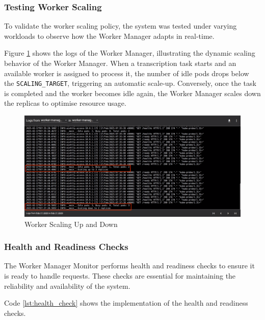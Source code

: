 \subsubsection{Testing Worker Scaling}
To validate the worker scaling policy, the system was tested under varying workloads to observe how the Worker Manager adapts in real-time.

Figure \ref{fig:worker_scaling_up_down} shows the logs of the Worker Manager, illustrating the dynamic scaling behavior of the Worker Manager. When a transcription task starts and an available worker is assigned to process it, the number of idle pods drops below the \texttt{SCALING\_TARGET}, triggering an automatic scale-up. Conversely, once the task is completed and the worker becomes idle again, the Worker Manager scales down the replicas to optimise resource usage.

\begin{figure}[H]
  \centering
  \includegraphics[width=\textwidth]{figures/worker_scaling_up_down.png}
  \caption{Worker Scaling Up and Down}
  \label{fig:worker_scaling_up_down}
\end{figure}

\subsubsection{Health and Readiness Checks}
The Worker Manager Monitor performs health and readiness checks to ensure it is ready to handle requests. These checks are essential for maintaining the reliability and availability of the system. 

Code \ref{lst:health_check} shows the implementation of the health and readiness checks.

